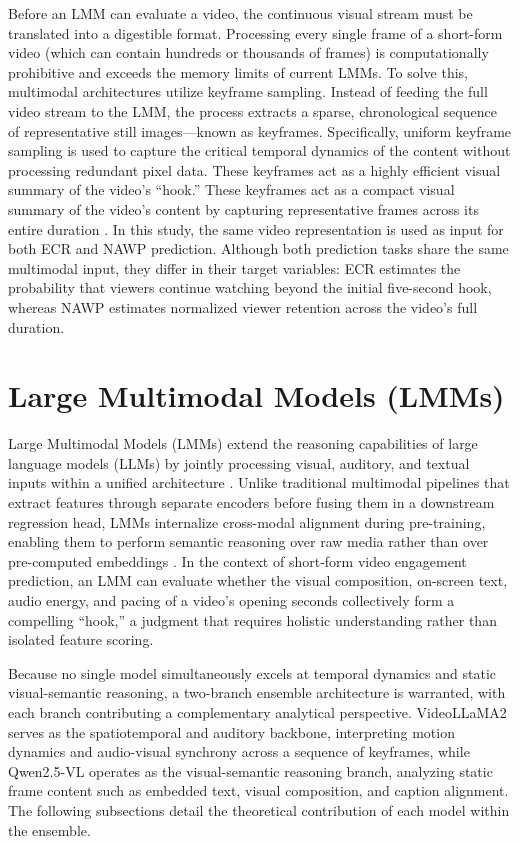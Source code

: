Before an LMM can evaluate a video, the continuous visual stream must be translated into a digestible format. Processing every single frame of a short-form video (which can contain hundreds or thousands of frames) is computationally prohibitive and exceeds the memory limits of current LMMs. To solve this, multimodal architectures utilize keyframe sampling. Instead of feeding the full video stream to the LMM, the process extracts a sparse, chronological sequence of representative still images—known as keyframes. Specifically, uniform keyframe sampling is used to capture the critical temporal dynamics of the content without processing redundant pixel data. These keyframes act as a highly efficient visual summary of the video's ``hook.'' These keyframes act as a compact visual summary of the video's content by capturing representative frames across its entire duration \cite{sun2025engagement}. In this study, the same video representation is used as input for both ECR and NAWP prediction. Although both prediction tasks share the same multimodal input, they differ in their target variables: ECR estimates the probability that viewers continue watching beyond the initial five-second hook, whereas NAWP estimates normalized viewer retention across the video's full duration.

\section{Large Multimodal Models (LMMs)}

Large Multimodal Models (LMMs) extend the reasoning capabilities of large language models (LLMs) by jointly processing visual, auditory, and textual inputs within a unified architecture \cite{ge2025lmm}. Unlike traditional multimodal pipelines that extract features through separate encoders before fusing them in a downstream regression head, LMMs internalize cross-modal alignment during pre-training, enabling them to perform semantic reasoning over raw media rather than over pre-computed embeddings \cite{sun2025engagement}. In the context of short-form video engagement prediction, an LMM can evaluate whether the visual composition, on-screen text, audio energy, and pacing of a video's opening seconds collectively form a compelling ``hook,'' a judgment that requires holistic understanding rather than isolated feature scoring.

Because no single model simultaneously excels at temporal dynamics and static visual-semantic reasoning, a two-branch ensemble architecture is warranted, with each branch contributing a complementary analytical perspective. VideoLLaMA2 serves as the spatiotemporal and auditory backbone, interpreting motion dynamics and audio-visual synchrony across a sequence of keyframes, while Qwen2.5-VL operates as the visual-semantic reasoning branch, analyzing static frame content such as embedded text, visual composition, and caption alignment. The  following subsections detail the theoretical contribution of each model within the ensemble.

